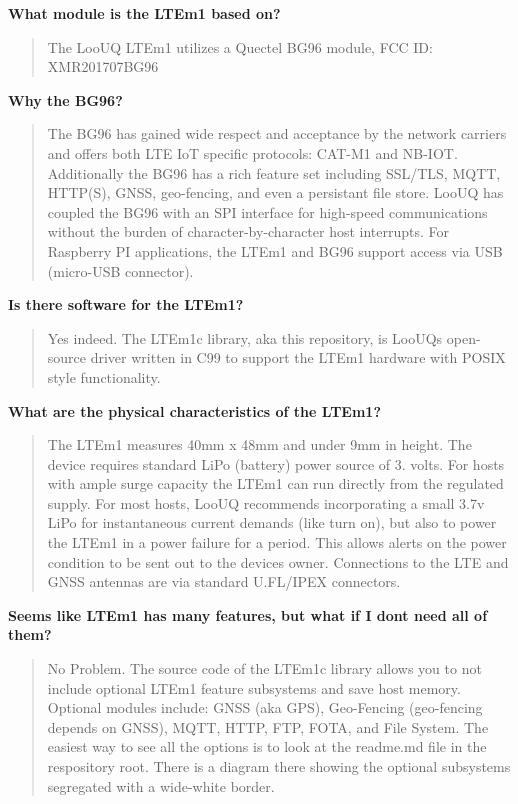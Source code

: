 {\bfseries{What module is the L\+T\+Em1 based on?}} \begin{quote}
The Loo\+UQ L\+T\+Em1 utilizes a Quectel B\+G96 module, F\+CC ID\+: X\+M\+R201707\+B\+G96 \end{quote}


{\bfseries{Why the B\+G96?}} \begin{quote}
The B\+G96 has gained wide respect and acceptance by the network carriers and offers both L\+TE IoT specific protocols\+: C\+A\+T-\/\+M1 and N\+B-\/\+I\+OT. Additionally the B\+G96 has a rich feature set including S\+S\+L/\+T\+LS, M\+Q\+TT, H\+T\+T\+P(\+S), G\+N\+SS, geo-\/fencing, and even a persistant file store. Loo\+UQ has coupled the B\+G96 with an S\+PI interface for high-\/speed communications without the burden of character-\/by-\/character host interrupts. For Raspberry PI applications, the L\+T\+Em1 and B\+G96 support access via U\+SB (micro-\/\+U\+SB connector). \end{quote}


{\bfseries{Is there software for the L\+T\+Em1?}} \begin{quote}
Yes indeed. The L\+T\+Em1c library, aka this repository, is Loo\+UQ\textquotesingle{}s open-\/source driver written in C99 to support the L\+T\+Em1 hardware with P\+O\+S\+IX style functionality. \end{quote}


{\bfseries{What are the physical characteristics of the L\+T\+Em1?}} \begin{quote}
The L\+T\+Em1 measures 40mm x 48mm and under 9mm in height. The device requires standard Li\+Po (battery) power source of 3. volts. For hosts with ample surge capacity the L\+T\+Em1 can run directly from the regulated supply. For most hosts, Loo\+UQ recommends incorporating a small 3.\+7v Li\+Po for instantaneous current demands (like turn on), but also to power the L\+T\+Em1 in a power failure for a period. This allows alerts on the power condition to be sent out to the devices owner. Connections to the L\+TE and G\+N\+SS antennas are via standard U.\+FL/\+I\+P\+EX connectors. \end{quote}


{\bfseries{Seems like L\+T\+Em1 has many features, but what if I don\textquotesingle{}t need all of them?}} \begin{quote}
No Problem. The source code of the L\+T\+Em1c library allows you to not include optional L\+T\+Em1 feature subsystems and save host memory. Optional modules include\+: G\+N\+SS (aka G\+PS), Geo-\/\+Fencing (geo-\/fencing depends on G\+N\+SS), M\+Q\+TT, H\+T\+TP, F\+TP, F\+O\+TA, and File System. The easiest way to see all the options is to look at the readme.\+md file in the respository root. There is a diagram there showing the optional subsystems segregated with a wide-\/white border. \end{quote}


